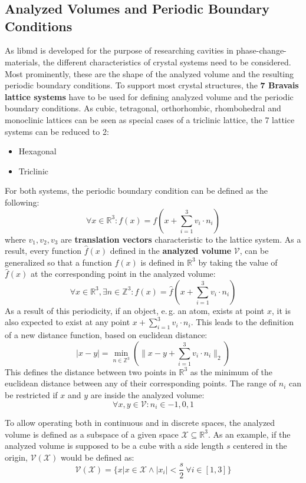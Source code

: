   \chapter{}
  \clearpage
  \section{Analyzed Volumes and Periodic Boundary Conditions}
  As libmd is developed for the purpose of researching cavities in phase-change-materials, the different characteristics of crystal systems need to be considered. Most prominently, these are the shape of the analyzed volume and the resulting periodic boundary conditions. To support most crystal structures, the \textbf{7 Bravais lattice systems} have to be used for defining analyzed volume and the periodic boundary conditions. As cubic, tetragonal, orthorhombic, rhombohedral and monoclinic lattices can be seen as special cases of a triclinic lattice, the 7 lattice systems can be reduced to 2:
  \begin{itemize}
  \item{Hexagonal}
  \item{Triclinic}
  \end{itemize}
  For both systems, the periodic boundary condition can be defined as the following:
  \[\forall x \in \mathbb{R}^3\colon f(x) = f(x+\sum_{i=1}^3 v_i \cdot n_i)\]
  where $v_1, v_2, v_3$ are \textbf{translation vectors} characteristic to the lattice system. As a result, every function $\hat{f}(x)$ defined in the \textbf{analyzed volume} $\mathcal{V}$, can be generalized so that a function $f(x)$ is defined in $\mathbb{R}^3$ by taking the value of $\hat{f}(x)$ at the corresponding point in the analyzed volume:
  \[\forall x \in \mathbb{R}^3, \exists n \in \mathbb{Z}^3\colon f(x) = \hat{f}(x+\sum_{i=1}^3 v_i \cdot n_i)\]
  As a result of this periodicity, if an object, e.\,g. an atom, exists at point $x$, it is also expected to exist at any point $x+\sum_{i=1}^3 v_i \cdot n_i$. This leads to the definition of a new distance function, based on euclidean distance:
  \[|x-y| = \min_{n \in \mathbb{Z}^3}(\|x-y+\sum_{i=1}^3 v_i \cdot n_i\|_2)\]
  This defines the distance between two points in $\mathbb{R}^3$ as the minimum of the euclidean distance between any of their corresponding points. The range of $n_i$ can be restricted if $x$ and $y$ are inside the analyzed volume:
  \[\forall x,y  \in \mathcal{V}\colon n_i\in {-1,0,1}\]

  To allow operating both in continuous and in discrete spaces, the analyzed volume is defined as a subspace of a given space $\mathcal{X} \subseteq \mathbb{R}^3$. As an example, if the analyzed volume is supposed to be a cube with a side length $s$ centered in the origin, $\mathcal{V}(\mathcal{X})$ would be defined as:
  \[\mathcal{V}(\mathcal{X}) = \{x | x \in \mathcal{X} \land |x_i| < \frac{s}{2} ~\forall i \in [1,3]\}\]
